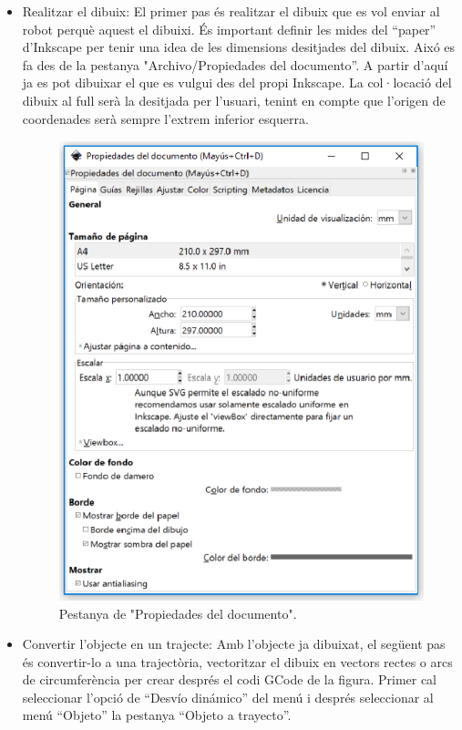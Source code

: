 \begin{itemize}
	
	\item	Realitzar el dibuix: El primer pas és realitzar el dibuix que es vol enviar al robot perquè aquest el dibuixi. És important definir les mides del “paper” d'Inkscape per tenir una idea de les dimensions desitjades del dibuix. Aixó es fa des de la pestanya "Archivo/Propiedades del documento”. A partir d'aquí ja es pot dibuixar el que es vulgui des del propi Inkscape. La col·locació del dibuix al full serà la desitjada per l'usuari, tenint en compte que l'origen de coordenades serà sempre l'extrem inferior esquerra. 
	
	\begin{figure}[H]
		\centering
		\includegraphics[scale=1.5]{1PropDocumento.eps}
		\caption{Pestanya de "Propiedades del documento".}
		\label{fig:PropDocumento}
	\end{figure}
	
	\item Convertir l'objecte en un trajecte: Amb l'objecte ja dibuixat, el següent pas és convertir-lo a una trajectòria, vectoritzar el dibuix en vectors rectes o arcs de circumferència per crear després el codi GCode de la figura. Primer cal seleccionar l'opció de “Desvío dinámico” del menú i després seleccionar al menú “Objeto” la pestanya “Objeto a trayecto”.
	

\end{itemize}
